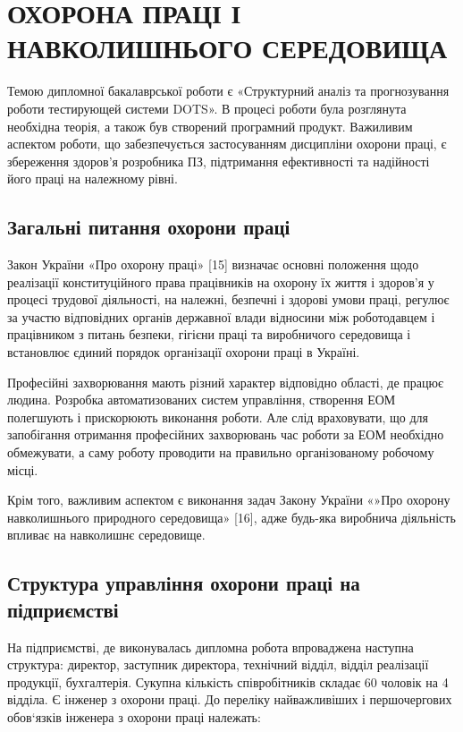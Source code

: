 \section{ОХОРОНА ПРАЦІ І НАВКОЛИШНЬОГО СЕРЕДОВИЩА}

Темою дипломної бакалаврської роботи є «Структурний аналіз та прогнозування роботи тестирующей системи DOTS». В процесі роботи була розглянута необхідна теорія, а також був створений програмний продукт. Важиливим аспектом роботи, що забезпечується застосуванням дисципліни охорони праці, є збереження здоров’я розробника ПЗ, підтримання ефективності та надійності його праці на належному рівні.

\subsection{Загальні питання охорони праці}

Закон України «Про охорону праці» [15] визначає основні положення щодо реалізації конституційного права працівників на охорону їх життя і здоров’я у процесі трудової діяльності, на належні, безпечні і здорові умови праці, регулює за участю відповідних органів державної влади відносини між роботодавцем і працівником з питань безпеки, гігієни праці та виробничого середовища і встановлює єдиний порядок організації охорони праці в Україні.

Професійні захворювання мають різний характер відповідно області, де працює людина. Розробка автоматизованих систем управління, створення ЕОМ полегшують і прискорюють виконання роботи. Але слід враховувати, що для запобігання отримання професійних захворювань час роботи за ЕОМ необхідно обмежувати, а саму роботу проводити на правильно організованому робочому місці.

Крім того, важливим аспектом є виконання задач Закону України «»Про охорону навколишнього природного середовища» [16], адже будь-яка виробнича діяльність впливає на навколишнє середовище.

\subsection{Структура управління охорони праці на підприємстві}

На підприємстві, де виконувалась дипломна робота впроваджена наступна структура: директор, заступник директора, технічний відділ, відділ реалізації продукції, бухгалтерія. Сукупна кількість співробітників складає 60 чоловік на 4 відділа. Є інженер з охорони праці. До переліку найважливіших і першочергових обов`язків інженера з охорони праці належать:

